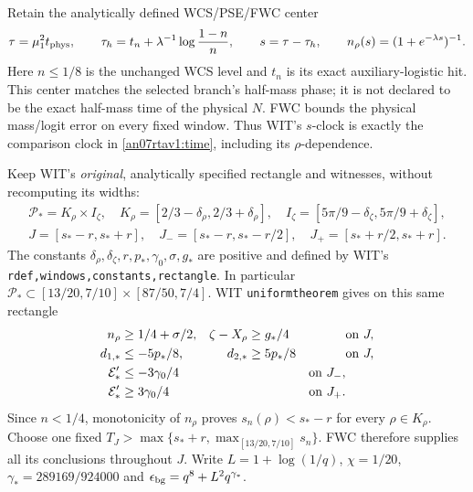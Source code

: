 \documentclass[11pt]{article}
\numberwithin{equation}{section}
\begin{document}
Retain the analytically defined WCS/PSE/FWC center
\begin{equation}
 \tau=\mu_1^2t_{\rm phys},\qquad
 \tau_h=t_n+\lambda^{-1}\log\frac{1-n}{n},\qquad
 s=\tau-\tau_h,\qquad n_\rho(s)=(1+e^{-\lambda s})^{-1}.
 \label{an07rtav1:time}
\end{equation}
Here \(n\le1/8\) is the unchanged WCS level and \(t_n\)
is its exact auxiliary-logistic hit. This center matches the
selected branch's half-mass phase; it is not declared to be the
exact half-mass time of the physical \(N\). FWC bounds the
physical mass/logit error on every fixed window. Thus WIT's
\(s\)-clock is exactly the comparison clock in
\eqref{an07rtav1:time}, including its \(\rho\)-dependence.

Keep WIT's \emph{original}, analytically specified rectangle
and witnesses, without recomputing its widths:
\begin{gather}
 \mathcal P_*=K_\rho\times I_\zeta,\quad
 K_\rho=[2/3-\delta_\rho,2/3+\delta_\rho],\quad
 I_\zeta=[5\pi/9-\delta_\zeta,5\pi/9+\delta_\zeta],
 \label{an07rtav1:rectangle}\\
 J=[s_*-r,s_*+r],\quad
 J_-=[s_*-r,s_*-r/2],\quad
 J_+=[s_*+r/2,s_*+r].
 \label{an07rtav1:windows}
\end{gather}
The constants \(\delta_\rho,\delta_\zeta,r,p_*,\gamma_0,\sigma,g_*\)
are positive and defined by WIT's
\texttt{rdef,\allowbreak windows,\allowbreak constants,\allowbreak rectangle}. In particular
\(\mathcal P_*\subset[13/20,7/10]\times[87/50,7/4]\).
WIT \texttt{uniformtheorem} gives on this same rectangle
\begin{align}
 n_\rho&\ge1/4+\sigma/2,& \zeta-X_\rho&\ge g_*/4&&\text{on }J,
 \notag\\
 d_{1,*}&\le-5p_*/8,&d_{2,*}&\ge5p_*/8&&\text{on }J,
 \label{an07rtav1:limitingmargins}\\
 \mathcal E_*'&\le-3\gamma_0/4&&&\text{on }J_-,\notag\\
 \mathcal E_*'&\ge3\gamma_0/4&&&\text{on }J_+.\notag
\end{align}
Since \(n<1/4\), monotonicity of \(n_\rho\) proves
\(s_n(\rho)<s_*-r\) for every \(\rho\in K_\rho\).
Choose one fixed
\(T_J>\max\{s_*+r,\max_{[13/20,7/10]}s_n\}\).
FWC therefore supplies all its conclusions throughout \(J\).
Write \(L=1+\log(1/q)\), \(\chi=1/20\),
\(\gamma_*=289169/924000\) and
\(\epsilon_{\rm bg}=q^8+L^2q^{\gamma_*}\).
\end{document}
